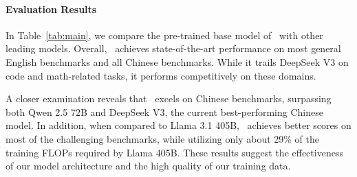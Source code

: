\paragraph{Evaluation Results}
In Table~\ref{tab:main}, we compare the pre-trained base model of \modelname~with other leading models. Overall, \modelname~achieves state-of-the-art performance on most general English benchmarks and all Chinese benchmarks.
While it trails DeepSeek V3 on code and math-related tasks, it performs competitively on these domains.

A closer examination reveals that \modelname~excels on Chinese benchmarks, surpassing both Qwen 2.5 72B and DeepSeek V3, the current best-performing Chinese model. 
In addition, when compared to Llama 3.1 405B, \modelname~achieves better scores on most of the challenging benchmarks, while utilizing only about 29\% of the training FLOPs required by Llama 405B.
These results suggest the effectiveness of our model architecture and the high quality of our training data.


